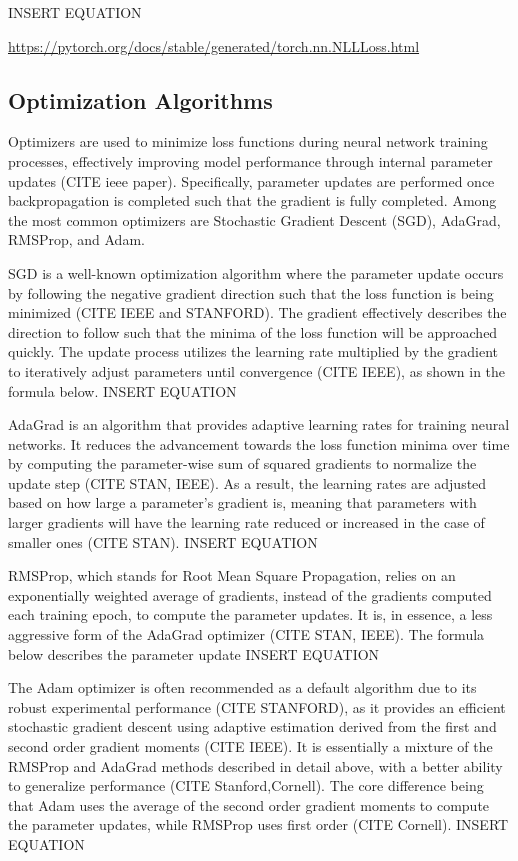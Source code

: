 \documentclass{article}
\begin{document}
	INSERT EQUATION

\url{https://pytorch.org/docs/stable/generated/torch.nn.NLLLoss.html }

\subsection{Optimization Algorithms}
Optimizers are used to minimize loss functions during neural network training processes, effectively improving model performance through internal parameter updates (CITE ieee paper). Specifically, parameter updates are performed once backpropagation is completed such that the gradient is fully completed. Among the most common optimizers are Stochastic Gradient Descent (SGD), AdaGrad, RMSProp, and Adam.  

SGD is a well-known optimization algorithm where the parameter update occurs by following the negative gradient direction such that the loss function is being minimized (CITE IEEE and STANFORD). The gradient effectively describes the direction to follow such that the minima of the loss function will be approached quickly. The update process utilizes the learning rate multiplied by the gradient to iteratively adjust parameters until convergence (CITE IEEE), as shown in the formula below.
	INSERT EQUATION

AdaGrad is an algorithm that provides adaptive learning rates for training neural networks. It reduces the advancement towards the loss function minima over time by computing the parameter-wise sum of squared gradients to normalize the update step (CITE STAN, IEEE). As a result, the learning rates are adjusted based on how large a parameter’s gradient is, meaning that parameters with larger gradients will have the learning rate reduced or increased in the case of smaller ones (CITE STAN). 
	INSERT EQUATION

RMSProp, which stands for Root Mean Square Propagation, relies on an exponentially weighted average of gradients, instead of the gradients computed each training epoch, to compute the parameter updates. It is, in essence, a less aggressive form of the AdaGrad optimizer (CITE STAN, IEEE). The formula below describes the parameter update
		INSERT EQUATION

The Adam optimizer is often recommended as a default algorithm due to its robust experimental performance (CITE STANFORD), as it provides an efficient stochastic gradient descent using adaptive estimation derived from the first and second order gradient moments (CITE IEEE). It is essentially a mixture of the RMSProp and AdaGrad methods described in detail above, with a better ability to generalize performance (CITE Stanford,Cornell). The core difference being that Adam uses the average of the second order gradient moments to compute the parameter updates, while RMSProp uses first order (CITE Cornell).
		INSERT EQUATION
\end{document}
